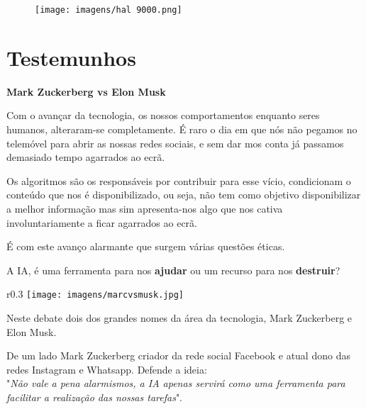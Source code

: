 \documentclass{report}
\begin{document}
\begin{figure}[ht]
    \centering
    \texttt{[image: imagens/hal 9000.png]}
    \caption{}
    \label{fig:hal9000}
\end{figure}
\chapter{Testemunhos}
\label{chap.testemunhos}

\begin{center}
    \LARGE{\textbf{Mark Zuckerberg vs Elon Musk}}    
\end{center}

\vspace{15pt}
Com o avançar da tecnologia, os nossos comportamentos enquanto seres humanos, alteraram-se completamente. É raro o dia em que nós não pegamos no telemóvel para abrir as nossas redes sociais, e sem dar mos conta já passamos demasiado tempo agarrados ao ecrã. 

Os algoritmos são os responsáveis por contribuir para esse vício, condicionam o conteúdo que nos é disponibilizado, ou seja, não tem como objetivo disponibilizar a melhor informação mas sim apresenta-nos algo que nos cativa involuntariamente a ficar agarrados ao ecrã.

É com este avanço alarmante que surgem várias questões éticas. 

\vspace{15pt}
A \ac{IA}, é uma ferramenta para nos \textbf{ajudar} ou 
um recurso para nos \textbf{destruir}?  
\vspace{5pt}



\begin{wrapfigure}{r}{0.3
\textwidth} 
    \centering
    \texttt{[image: imagens/marcvsmusk.jpg]}
    \footnotesize{\caption{}}
    \label{muskzuc}
\end{wrapfigure}



Neste debate dois dos grandes nomes da área da tecnologia, Mark Zuckerberg e Elon Musk. 

De um lado Mark Zuckerberg criador da rede social Facebook e atual dono das redes Instagram e Whatsapp. Defende a ideia:\\
"\textit{Não vale a pena alarmismos, a \ac{IA} apenas servirá como uma ferramenta para facilitar a realização das nossas tarefas}".

\vspace{10pt}
\end{document}
